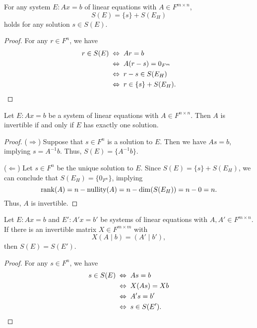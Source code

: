 \begin{proposition}
  For any system $E: Ax = b$ of linear equations with $A \in F^{m \times n}$,
  \begin{equation*}
    S(E) = \{s\} + S(E_H)
  \end{equation*}
  holds for any solution $s \in S(E)$.
\end{proposition}
\begin{proof}
  For any $r \in F^n$, we have
  \begin{align*}
    r \in S(E)
    &\; \Leftrightarrow \; Ar = b \\
    &\; \Leftrightarrow \; A(r - s) = 0_{F^m} \\
    &\; \Leftrightarrow \; r - s \in S(E_H) \\
    &\; \Leftrightarrow \; r \in \{s\} + S(E_H).
    \qedhere
  \end{align*}
\end{proof}

\begin{theorem}
  \label{thm:num-solutions}
  Let $E: Ax = b$ be a system of linear equations with $A \in F^{n \times n}$.
  Then $A$ is invertible if and only if $E$ has exactly one solution.
\end{theorem}
\begin{proof}
  ($\Rightarrow$)
  Suppose that $s \in F^n$ is a solution to $E$.
  Then we have $As = b$, implying $s = A^{-1}b$.
  Thus, $S(E) = \{A^{-1}b\}$.

  ($\Leftarrow$)
  Let $s \in F^n$ be the unique solution to $E$.
  Since $S(E) = \{s\} + S(E_H)$, we can conclude that $S(E_H) = \{0_{F^n}\}$,
  implying
  \begin{equation*}
    \operatorname{rank}(A) = n - \operatorname{nullity}(A) = n - \dim(S(E_H)) = n - 0 = n.
  \end{equation*}
  Thus, $A$ is invertible.
\end{proof}

\begin{theorem}
  Let $E: Ax = b$ and $E': A'x = b'$ be systems of linear equations with
  $A, A' \in F^{m \times n}$.
  If there is an invertible matrix $X \in F^{m \times m}$ with
  \begin{equation*}
    X(A \mid b) = (A' \mid b'),
  \end{equation*}
  then $S(E) = S(E')$.
\end{theorem}
\begin{proof}
  For any $s \in F^n$, we have
  \begin{align*}
    s \in S(E)
    &\; \Leftrightarrow \; As = b \\
    &\; \Leftrightarrow \; X(As) = Xb \\
    &\; \Leftrightarrow \; A's = b' \\
    &\; \Leftrightarrow \; s \in S(E').
    \qedhere
  \end{align*}
\end{proof}

